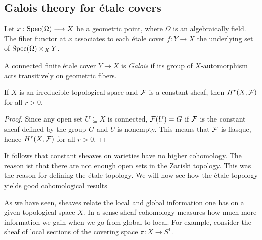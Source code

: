 \subsection{Galois theory for \'etale covers}
\begin{definition}
  Let $x: \operatorname{Spec}(\Omega) \longrightarrow X$ be a geometric point, where $\Omega$ is an algebraically field. The fiber functor at $x$ associates to each \'etale cover $f: Y \to X$ the underlying set of $\operatorname{Spec}(\Omega) \times_X Y$.
\end{definition}

\begin{definition}
  A connected finite \'etale cover $Y \to X$ is \textit{Galois} if its group of $X$-automorphism acts transitively on geometric fibers.
\end{definition}

\begin{theorem}
  If $X$ is an irreducible topological space and $\mathcal{F}$ is a constant sheaf, then $H^r(X, \mathcal{F})$ for all $r>0$.
\end{theorem}
\begin{proof}
  Since any open set $U \subseteq X$ is connected, $\mathcal{F}(U) = G$ if $\mathcal{F}$ is the constant sheaf defined by the group $G$ and $U$ is nonempty. This means that $\mathcal{F}$ is flasque, hence $H^r(X, \mathcal{F})$ for all $r>0$.
\end{proof}
It follows that constant sheaves on varieties have no higher cohomology. The reason ist that there are not enough open sets in the Zariski topology. This was the reason for defining the \'etale topology. We will now see how the \'etale topology yields good cohomological results

As we have seen, sheaves relate the local and global information one has on a given topological space $X$. In a sense sheaf cohomology measures how much more information we gain when we go from global to local. For example, consider the sheaf of local sections of the covering space $\pi : X \to S^1$.


